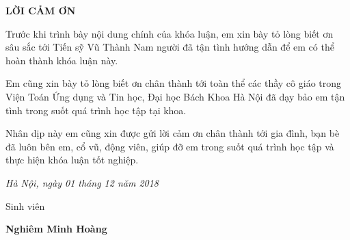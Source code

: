 \centerline{\bf \large\MakeUppercase{Lời cảm ơn}}

\vspace{20pt}

Trước khi trình bày nội dung chính của khóa luận, em xin bày tỏ lòng biết ơn sâu sắc tới Tiến sỹ Vũ Thành Nam người đã tận tình hướng dẫn để em có thể hoàn thành khóa luận này.
      
Em cũng xin bày tỏ lòng biết ơn chân thành tới toàn thể các thầy cô giáo trong Viện Toán Ứng dụng và Tin học, Đại học Bách Khoa Hà Nội đã dạy bảo em tận tình trong suốt quá trình học tập tại khoa.

Nhân dịp này em cũng xin được gửi lời cảm ơn chân thành tới gia đình, bạn bè đã luôn bên em, cổ vũ, động viên, giúp đỡ em trong suốt quá trình học tập và thực hiện khóa luận tốt nghiệp. 

 \begin{flushright}
{\it Hà Nội, ngày 01 tháng 12 năm 2018}

Sinh viên \hskip 2cm\quad

\vskip 2cm
{\bf Nghiêm Minh Hoàng} \hskip 1cm \quad\ 
 \end{flushright}

